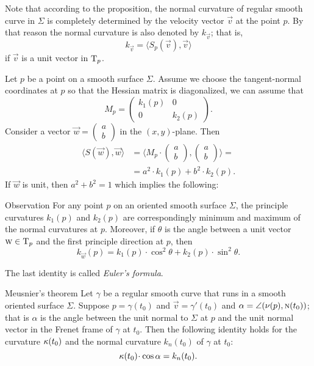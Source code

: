 Note that according to the proposition, the normal curvature of regular smooth curve in $\Sigma$ is completely determined by the velocity vector $\vec v$ at the point $p$.
By that reason the normal curvature is also denoted by $k_{\vec v}$;
that is,
\[k_{\vec v}=\langle S_p(\vec v),\vec v\rangle\]
if $\vec v$ is a unit vector in $\mathrm{T}_p$.







Let $p$ be a point on a smooth surface $\Sigma$.
Assume we choose the tangent-normal coordinates at $p$ so that the Hessian matrix is diagonalized, we can assume that
\[M_p=\begin{pmatrix}
   k_1(p)
   &0
   \\
   0
   &k_2(p)
  \end{pmatrix}.
\]
Consider a vector ${\vec w}=(\begin{smallmatrix}a\\b
\end{smallmatrix})$ in the $(x,y)$-plane.
Then
\begin{align*}
\langle S(\vec w),\vec w\rangle
&=\langle M_p\cdot(\begin{smallmatrix}a\\b
\end{smallmatrix}),(\begin{smallmatrix}a\\b
\end{smallmatrix})\rangle=
\\
&=a^2\cdot k_1(p) +b^2\cdot k_2(p). 
\end{align*}
If ${\vec w}$ is unit, then $a^2+b^2=1$ which implies the following:

\begin{thm}{Observation}\label{obs:k1-k2}
For any point $p$ on an oriented smooth surface $\Sigma$,
the principle curvatures $k_1(p)$ and $k_2(p)$ are correspondingly minimum and maximum of the normal curvatures at $p$.
Moreover, if $\theta$ is the angle between a unit vector ${\textsc w}\in\mathrm{T}_p$ and the first principle direction at $p$, then 
\[k_{\vec w}(p)=k_1(p)\cdot\cos^2\theta+k_2(p)\cdot\sin^2\theta.\]

\end{thm}

The last identity is called \emph{Euler's formula}.


\begin{thm}{Meusnier's theorem}\label{thm:meusnier}
Let $\gamma$ be a regular smooth curve that runs in a smooth oriented surface $\Sigma$.
Suppose $p=\gamma(t_0)$ and ${\vec v}=\gamma'(t_0)$ and $\alpha=\angle(\nu(p),\textsc{n}(t_0))$;
that is $\alpha$ is the angle between the unit normal to $\Sigma$ at $p$ and the unit normal vector in the Frenet frame of $\gamma$ at $t_0$.
Then the following identity holds for the curvature $\kappa(t_0)$ and the normal curvature $k_n(t_0)$ of $\gamma$ at $t_0$:  
\[\kur(t_0)\cdot\cos\alpha=k_{n}(t_0).\]

\end{thm}


